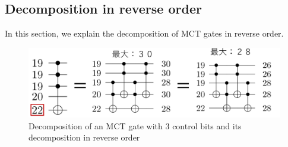 \subsection{Decomposition in reverse order}
In this section, we explain the decomposition of MCT gates in reverse order.

\begin{figure}[tbp]

\centering

\includegraphics[width=0.95\linewidth]{img/reverse_mct.pdf}

\caption{Decomposition of an MCT gate with 3 control bits and its decomposition in reverse order}

\label{reverse}

\end{figure}

